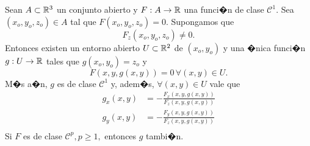 \documentclass[a4paper]{scrartcl} %
\begin{document}
\begin{theorem} \label{teo:implicit_part}
\mbox{}

Sean $A \subset \mathbb{R}^3$ un conjunto abierto y $F: A \to \mathbb{R}$ una funci�n de clase $\mathcal{C}^1$. Sea $(x_o,y_o,z_o) \in A$ tal que $F(x_o,y_o,z_o) = 0$. Supongamos que 
 \[
   F_z (x_o,y_o,z_o) \ne 0.
 \]
 Entonces existen un entorno abierto $U \subset \mathbb{R}^2$ de $(x_o,y_o)$
 y una �nica funci�n $g: U \to \mathbb{R}$ tales que $g(x_o,y_o) = z_o$ y
 \[
  F(x,y,g(x,y)) = 0 \, \forall (x,y) \in U.
 \]
 M�s a�n, $g$ es de clase $\mathcal{C}^1$ y, adem�s, $\forall (x,y) \in U$ vale que
 \begin{align*}
  g_{x}(x,y) &= -\frac{F_x (x,y,g(x,y))}{F_z (x,y,g(x,y))}  \\
  g_{y}(x,y) &= -\frac{F_y (x,y,g(x,y))}{F_z (x,y,g(x,y))} \\
 \end{align*}
 Si $F$ es de clase $\mathcal{C}^p, p \ge 1,$ entonces $g$ tambi�n.
 
\end{theorem}
\end{document}
